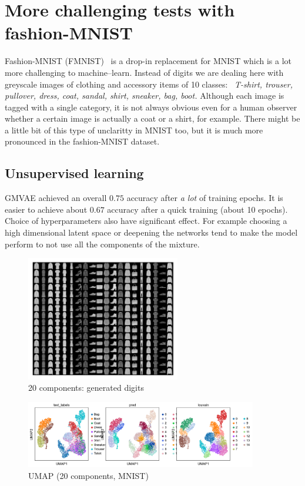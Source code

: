 \documentclass[11pt, a4paper]{report}
\theoremstyle{plain}
\theoremstyle{definition}
\theoremstyle{remark}
\begin{document}
\chapter{More challenging tests with fashion-MNIST}
Fashion-MNIST (FMNIST)~\cite{fmnist} is a drop-in replacement for MNIST which
is a lot more challenging to machine--learn. Instead of digits we are dealing
here with greyscale images of clothing and accessory items of 10
classes:~
\emph{
T-shirt, trouser, pullover, dress, coat, sandal, shirt, sneaker, bag, boot.
}
Although each image is tagged with a single category, it is not always obvious
even for a human observer whether a certain image is actually a coat or a shirt,
for example. There might be a little bit of this type of unclaritty in MNIST
too, but it is much more pronounced in the fashion-MNIST dataset.

\section{Unsupervised learning}

GMVAE achieved an overall $0.75$ accuracy after \emph{a lot} of training epochs.
It is easier to achieve about $0.67$ accuracy after a quick training (about 10
epochs).
Choice of hyperparameters also have significant effect. For example choosing 
a high dimensional latent space or deepening the networks tend to make the model
perform to not use all the components of the mixture.

\begin{figure}[h]
\centering
\includegraphics[width=0.6\textwidth]{images/gmmvae_fmnist_us_20c_samples0.png}
\caption{20 components: generated digits}
\label{fig:fmnist_us_20c_samples}
\end{figure}

\begin{figure}[h]
\centering
\includegraphics[width=0.9\textwidth]{images/gmmvae_fmnist_us_20c_umap0.png}
\caption{UMAP (20 components, MNIST)}
\label{fig:fmnist_us_20c_latent}
\end{figure}
\end{document}
